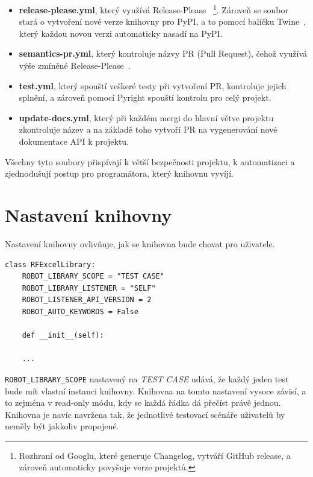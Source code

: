 \begin{itemize}
    \item \textbf{release-please.yml}\label{release-please}, který využívá Release-Please~\cite{ReleasePlease} \footnote{Rozhraní od Googlu, které generuje Changelog, vytváří GitHub release, a zároveň automaticky povyšuje verze projektů.}. Zároveň se soubor stará o vytvoření nové verze knihovny pro PyPI, a to pomocí balíčku Twine~\cite{twine}, který každou novou verzi automaticky nasadí na PyPI.
    \item \textbf{semantics-pr.yml}, který kontroluje názvy PR (Pull Request), čehož využívá výše zmíněné Release-Please~\cite{Semantics}.
    \item \textbf{test.yml}, který spouští veškeré testy při vytvoření PR, kontroluje jejich splnění, a zároveň pomocí Pyright spouští kontrolu pro celý projekt.
    \item \textbf{update-docs.yml}, který při každém mergi do hlavní větve projektu zkontroluje název a na základě toho vytvoří PR na vygenerování nové dokumentace API k projektu.
\end{itemize}

Všechny tyto soubory přispívají k větší bezpečnosti projektu, k automatizaci a zjednodušují postup pro programátora, který knihovnu vyvíjí. 

\section{Nastavení knihovny}

Nastavení knihovny ovlivňuje, jak se knihovna bude chovat pro uživatele. 

\begin{listing}[H]
    \begin{verbatim}
class RFExcelLibrary:
    ROBOT_LIBRARY_SCOPE = "TEST CASE"
    ROBOT_LIBRARY_LISTENER = "SELF"
    ROBOT_LISTENER_API_VERSION = 2
    ROBOT_AUTO_KEYWORDS = False

    def __init__(self):
    
    ...
    \end{verbatim}
    
    \caption{Nastavení knihovny - vlastní tvorba}
    \label{list:demo-library}
\end{listing}

\texttt{ROBOT\_LIBRARY\_SCOPE} nastavený na \textit{TEST CASE} udává, že každý jeden test bude mít vlastní instanci knihovny. Knihovna na tomto nastavení vysoce závisí, a to zejména v read-only módu, kdy se každá řádka dá přečíst právě jednou. Knihovna je navíc navržena tak, že jednotlivé testovací scénáře uživatelů by neměly být jakkoliv propojené.


